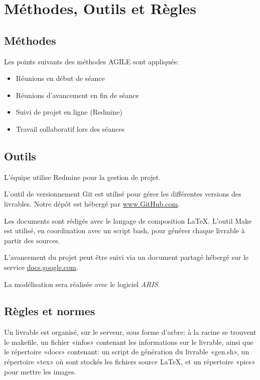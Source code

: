 \documentclass[twoside]{article}
\begin{document}

\section{Méthodes, Outils et Règles}

\subsection{Méthodes}
Les points suivants des méthodes AGILE sont appliqués:
\begin{itemize}
\item Réunions en début de séance
\item Réunions d'avancement en fin de séance
\item Suivi de projet en ligne (Redmine)
\item Travail collaboratif lors des séances
\end{itemize}

\subsection{Outils}
L'équipe utilise Redmine pour la gestion de projet.
\label{outils}

L'outil de versionnement Git est utilisé pour gérer les différentes versions
des livrables. Notre dépôt est hébergé par \url{www.GitHub.com}.

Les documents sont rédigés avec le langage de composition \LaTeX.
L'outil Make est utilisé, en coordination avec un script bash, pour générer
chaque livrable à partir des sources.

L'avancement du projet peut être suivi via un document partagé hébergé
sur le service \url{docs.google.com}.

La modélisation sera réalisée avec le logiciel \textsl{ARIS}.

\subsection{Règles et normes}

Un livrable est organisé, sur le serveur, sous forme d'arbre: à la racine
se trouvent le makefile, un fichier «infos» contenant les informations sur le
livrable, ainsi que le répertoire «docs» contenant: un script de génération
du livrable «gen.sh», un répertoire «tex» où sont stockés les fichiers source \LaTeX,
et un répertoire «pics» pour mettre les images.
\end{document}
